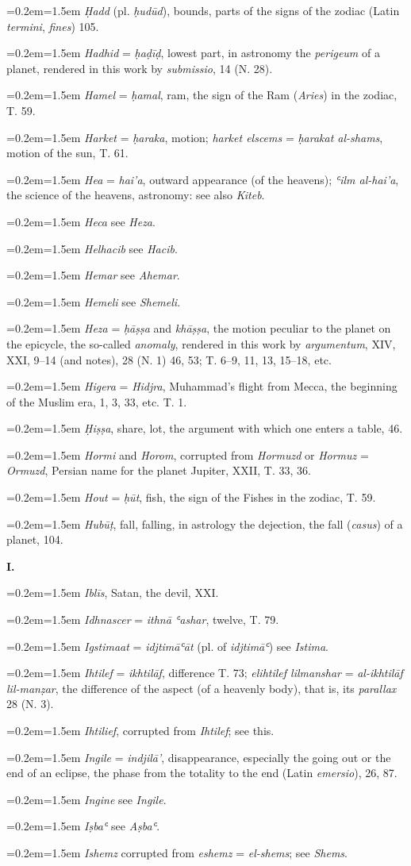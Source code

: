 \documentclass[11pt]{article}
\newcommand{\Entry}[1]{\par{\parskip=0.2em\relax\noindent\hangindent=1.5em\hangafter=1 #1\par}}
\begin{document}
\Entry{\emph{Ḥadd} (pl. \emph{ḥudūd}), bounds, parts of the signs of the zodiac (Latin \emph{termini}, \emph{fines}) 105.}
\Entry{\emph{Hadhid} = \emph{ḥaḍīḍ}, lowest part, in astronomy the \emph{perigeum} of a planet, rendered in this work by \emph{submissio}, 14 (N. 28).}
\Entry{\emph{Hamel} = \emph{ḥamal}, ram, the sign of the Ram (\emph{Aries}) in the zodiac, T. 59.}
\Entry{\emph{Harket} = \emph{ḥaraka}, motion; \emph{harket elscems} = \emph{ḥarakat al-shams}, motion of the sun, T. 61.}
\Entry{\emph{Hea} = \emph{hai’a}, outward appearance (of the heavens); \emph{ʿilm al-hai’a}, the science of the heavens, astronomy: see also \emph{Kiteb}.}
\Entry{\emph{Heca} see \emph{Heza}.}
\Entry{\emph{Helhacib} see \emph{Hacib}.}
\Entry{\emph{Hemar} see \emph{Ahemar}.}
\Entry{\emph{Hemeli} see \emph{Shemeli}.}
\Entry{\emph{Heza} = \emph{ḥāṣṣa} and \emph{khāṣṣa}, the motion peculiar to the planet on the epicycle, the so-called \emph{anomaly}, rendered in this work by \emph{argumentum}, XIV, XXI, 9–14 (and notes), 28 (N. 1) 46, 53; T. 6–9, 11, 13, 15–18, etc.}
\Entry{\emph{Higera} = \emph{Hidjra}, Muhammad's flight from Mecca, the beginning of the Muslim era, 1, 3, 33, etc. T. 1.}
\Entry{\emph{Ḥiṣṣa}, share, lot, the argument with which one enters a table, 46.}
\Entry{\emph{Hormi} and \emph{Horom}, corrupted from \emph{Hormuzd} or \emph{Hormuz} = \emph{Ormuzd}, Persian name for the planet Jupiter, XXII, T. 33, 36.}
\Entry{\emph{Hout} = \emph{ḥūt}, fish, the sign of the Fishes in the zodiac, T. 59.}
\Entry{\emph{Hubūṭ}, fall, falling, in astrology the dejection, the fall (\emph{casus}) of a planet, 104.}
\par\begin{center}\textbf{I.}\end{center}
\Entry{\emph{Iblīs}, Satan, the devil, XXI.}
\Entry{\emph{Idhnascer} = \emph{ithnā ʿashar}, twelve, T. 79.}
\Entry{\emph{Igstimaat} = \emph{idjtimāʿāt} (pl. of \emph{idjtimāʿ}) see \emph{Istima}.}
\Entry{\emph{Ihtilef} = \emph{ikhtilāf}, difference T. 73; \emph{elihtilef lilmanshar} = \emph{al-ikhtilāf lil-manẓar}, the difference of the aspect (of a heavenly body), that is, its \emph{parallax} 28 (N. 3).}
\Entry{\emph{Ihtilief}, corrupted from \emph{Ihtilef}; see this.}
\Entry{\emph{Ingile} = \emph{indjilā’}, disappearance, especially the going out or the end of an eclipse, the phase from the totality to the end (Latin \emph{emersio}), 26, 87.}
\Entry{\emph{Ingine} see \emph{Ingile}.}
\Entry{\emph{Iṣbaʿ} see \emph{Aṣbaʿ}.}
\Entry{\emph{Ishemz} corrupted from \emph{eshemz} = \emph{el-shems}; see \emph{Shems}.}
\end{document}
